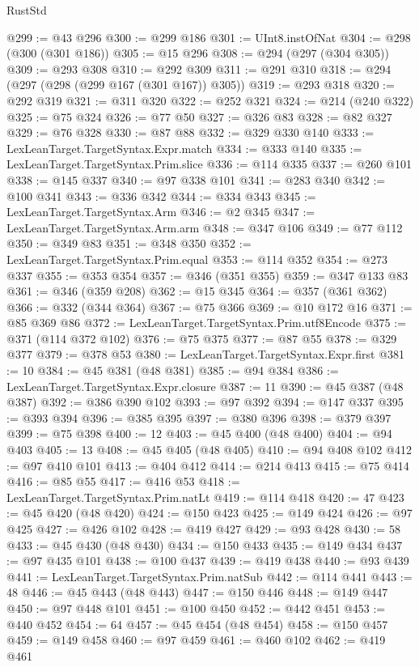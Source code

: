 \begin{lexlean}{RustStd}
\begin{coremodule}
@299 := @43 @296
@300 := @299 @186
@301 := UInt8.instOfNat
@304 := @298 (@300 (@301 @186))
@305 := @15 @296
@308 := @294 (@297 (@304 @305))
@309 := @293 @308
@310 := @292 @309
@311 := @291 @310
@318 := @294 (@297 (@298 (@299 @167 (@301 @167)) @305))
@319 := @293 @318
@320 := @292 @319
@321 := @311 @320
@322 := @252 @321
@324 := @214 (@240 @322)
@325 := @75 @324
@326 := @77 @50
@327 := @326 @83
@328 := @82 @327
@329 := @76 @328
@330 := @87 @88
@332 := @329 @330 @140
@333 := LexLeanTarget.TargetSyntax.Expr.match
@334 := @333 @140
@335 := LexLeanTarget.TargetSyntax.Prim.slice
@336 := @114 @335
@337 := @260 @101
@338 := @145 @337
@340 := @97 @338 @101
@341 := @283 @340
@342 := @100 @341
@343 := @336 @342
@344 := @334 @343
@345 := LexLeanTarget.TargetSyntax.Arm
@346 := @2 @345
@347 := LexLeanTarget.TargetSyntax.Arm.arm
@348 := @347 @106
@349 := @77 @112
@350 := @349 @83
@351 := @348 @350
@352 := LexLeanTarget.TargetSyntax.Prim.equal
@353 := @114 @352
@354 := @273 @337
@355 := @353 @354
@357 := @346 (@351 @355)
@359 := @347 @133 @83
@361 := @346 (@359 @208)
@362 := @15 @345
@364 := @357 (@361 @362)
@366 := @332 (@344 @364)
@367 := @75 @366
@369 := @10 @172 @16
@371 := @85 @369 @86
@372 := LexLeanTarget.TargetSyntax.Prim.utf8Encode
@375 := @371 (@114 @372 @102)
@376 := @75 @375
@377 := @87 @55
@378 := @329 @377
@379 := @378 @53
@380 := LexLeanTarget.TargetSyntax.Expr.first
@381 := 10
@384 := @45 @381 (@48 @381)
@385 := @94 @384
@386 := LexLeanTarget.TargetSyntax.Expr.closure
@387 := 11
@390 := @45 @387 (@48 @387)
@392 := @386 @390 @102
@393 := @97 @392
@394 := @147 @337
@395 := @393 @394
@396 := @385 @395
@397 := @380 @396
@398 := @379 @397
@399 := @75 @398
@400 := 12
@403 := @45 @400 (@48 @400)
@404 := @94 @403
@405 := 13
@408 := @45 @405 (@48 @405)
@410 := @94 @408 @102
@412 := @97 @410 @101
@413 := @404 @412
@414 := @214 @413
@415 := @75 @414
@416 := @85 @55
@417 := @416 @53
@418 := LexLeanTarget.TargetSyntax.Prim.natLt
@419 := @114 @418
@420 := 47
@423 := @45 @420 (@48 @420)
@424 := @150 @423
@425 := @149 @424
@426 := @97 @425
@427 := @426 @102
@428 := @419 @427
@429 := @93 @428
@430 := 58
@433 := @45 @430 (@48 @430)
@434 := @150 @433
@435 := @149 @434
@437 := @97 @435 @101
@438 := @100 @437
@439 := @419 @438
@440 := @93 @439
@441 := LexLeanTarget.TargetSyntax.Prim.natSub
@442 := @114 @441
@443 := 48
@446 := @45 @443 (@48 @443)
@447 := @150 @446
@448 := @149 @447
@450 := @97 @448 @101
@451 := @100 @450
@452 := @442 @451
@453 := @440 @452
@454 := 64
@457 := @45 @454 (@48 @454)
@458 := @150 @457
@459 := @149 @458
@460 := @97 @459
@461 := @460 @102
@462 := @419 @461

\end{coremodule}
\end{lexlean}
